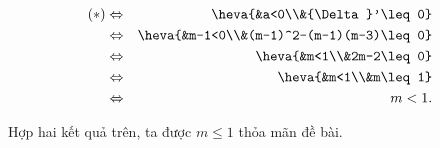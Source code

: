 \begin{bt}
{\begin{enumerate}
\begin{itemize}
					\allowdisplaybreaks
				\begin{eqnarray*}
				(*) &\Leftrightarrow&\heva{&a<0\\&{\Delta}'\leq 0}\\
					&\Leftrightarrow&\heva{&m-1<0\\&(m-1)^2-(m-1)(m-3)\leq 0}\\
					&\Leftrightarrow&\heva{&m<1\\&2m-2\leq 0}\\
					&\Leftrightarrow& \heva{&m<1\\&m\leq 1}\\
					&\Leftrightarrow& m<1.
				\end{eqnarray*}
			\end{itemize}
		\end{enumerate}
		Hợp hai kết quả trên, ta được ${m \leq 1}$ thỏa mãn đề bài.}
\end{bt}


